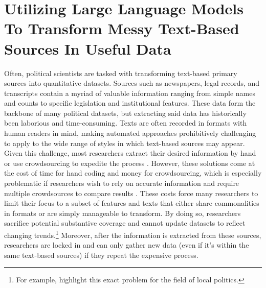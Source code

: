 \chapter{Utilizing Large Language Models To Transform Messy Text-Based Sources In Useful Data}
\label{chap:cahpter3}

Often, political scientists are tasked with transforming text-based primary sources into quantitative datasets. Sources such as newspapers, legal records, and transcripts contain a myriad of valuable information ranging from simple names and counts to specific legislation and institutional features. These data form the backbone of many political datasets, but extracting said data has historically been laborious and time-consuming. Texts are often recorded in formats with human readers in mind, making automated approaches prohibitively challenging to apply to the wide range of styles in which text-based sources may appear. Given this challenge, most researchers extract their desired information by hand or use crowdsourcing to expedite the process \citep{sumnerCrowdsourcingReliableLocal2020,bohannonSocialSciencePennies2011}. However, these solutions come at the cost of time for hand coding and money for crowdsourcing, which is especially problematic if researchers wish to rely on accurate information and require multiple crowdsources to compare results \citep{benoitCrowdsourcedTextAnalysis2016,carlsonPairwiseComparisonFramework2017}. These costs force many researchers to limit their focus to a subset of features and texts that either share commonalities in formats or are simply manageable to transform. By doing so, researchers sacrifice potential substantive coverage and cannot update datasets to reflect changing trends.\footnote{For example, \citet{debenedictis-kessnerMayoralPartisanshipMunicipal2016} highlight this exact problem for the field of local politics.} Moreover, after the information is extracted from these sources, researchers are locked in and can only gather new data (even if it's within the same text-based sources) if they repeat the expensive process.

